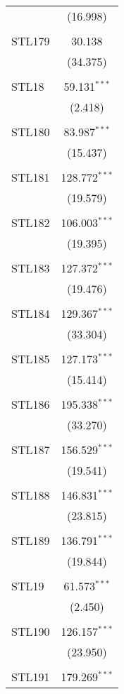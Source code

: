 \begin{table}[!htbp]
\begin{tabular}{@{\extracolsep{5pt}}lc}
  & (16.998) \\ 
  & \\ 
 STL179 & 30.138 \\ 
  & (34.375) \\ 
  & \\ 
 STL18 & 59.131$^{***}$ \\ 
  & (2.418) \\ 
  & \\ 
 STL180 & 83.987$^{***}$ \\ 
  & (15.437) \\ 
  & \\ 
 STL181 & 128.772$^{***}$ \\ 
  & (19.579) \\ 
  & \\ 
 STL182 & 106.003$^{***}$ \\ 
  & (19.395) \\ 
  & \\ 
 STL183 & 127.372$^{***}$ \\ 
  & (19.476) \\ 
  & \\ 
 STL184 & 129.367$^{***}$ \\ 
  & (33.304) \\ 
  & \\ 
 STL185 & 127.173$^{***}$ \\ 
  & (15.414) \\ 
  & \\ 
 STL186 & 195.338$^{***}$ \\ 
  & (33.270) \\ 
  & \\ 
 STL187 & 156.529$^{***}$ \\ 
  & (19.541) \\ 
  & \\ 
 STL188 & 146.831$^{***}$ \\ 
  & (23.815) \\ 
  & \\ 
 STL189 & 136.791$^{***}$ \\ 
  & (19.844) \\ 
  & \\ 
 STL19 & 61.573$^{***}$ \\ 
  & (2.450) \\ 
  & \\ 
 STL190 & 126.157$^{***}$ \\ 
  & (23.950) \\ 
  & \\ 
 STL191 & 179.269$^{***}$ \\ 

\end{tabular}
\end{table}
